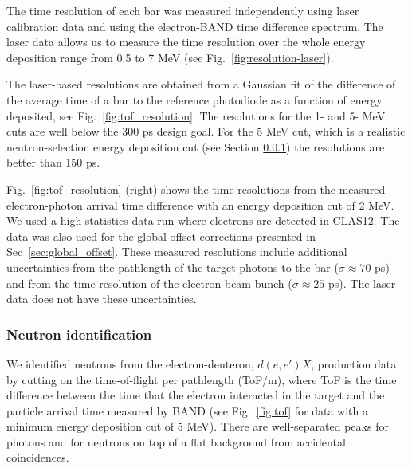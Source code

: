 \documentclass[3p,twocolumn]{elsarticle}
\begin{document}
\setcounter{footnote}{2} 
The time resolution of each bar was measured
independently using laser calibration data and using the electron-BAND
time difference spectrum. The laser data allows us to measure the time
resolution over the whole energy deposition range from 0.5 to 7 \si{\mega\electronvolt}  (see
Fig.~\ref{fig:resolution-laser}).

The laser-based resolutions are obtained from a Gaussian fit of the difference of
the average time of a bar to the reference photodiode as a function of energy
deposited, see Fig.~\ref{fig:tof_resolution}. The resolutions for the
1- and 5- \si{\mega\electronvolt} cuts are well below the 300 \si{\pico\s} design goal. For the 5 \si{\mega\electronvolt} cut, which
is a realistic neutron-selection energy deposition cut (see Section
\ref{sec:neutronidentification}) the resolutions are better than 150 \si{\pico\s}.

Fig.~\ref{fig:tof_resolution} (right) shows the time resolutions from
the measured electron-photon arrival time difference with an energy deposition cut of 2 \si{\mega\electronvolt}. We used a high-statistics data run where
electrons are detected in CLAS12. The data was also used for the
global offset corrections presented in Sec~\ref{sec:global_offset}.
These measured resolutions include
additional uncertainties from the pathlength of the target photons
to the bar ($\sigma\approx 70$ \si{\pico\s}) and from the time resolution of the electron beam bunch ($\sigma \approx 25$ \si{\pico\s}). The
laser data does not have these uncertainties.


\subsubsection{Neutron identification}
\label{sec:neutronidentification}
We identified neutrons from the electron-deuteron, $d(e,e')X$,
production data by cutting on the
time-of-flight per pathlength (ToF/m), where ToF is the time difference
between the time that the electron
interacted in the target and the particle arrival time measured by
BAND (see Fig.~\ref{fig:tof} for data with a minimum energy deposition
cut of 5 \si{\MeV}). There are well-separated peaks for
photons and for neutrons on top of a flat background from accidental coincidences. 
\end{document}
